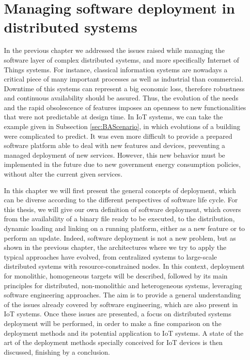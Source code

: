 \chapter{Managing software deployment in distributed systems}
\label{ch:managingDS}
In the previous chapter we addressed the issues raised while managing the software layer of complex distributed systems, and more specifically Internet of Things systems.
For instance, classical information systems are nowadays a critical piece of many important processes as well as industrial than commercial.
Downtime of this systems can represent a big economic loss, therefore robustness and continuous availability should be assured.
Thus, the evolution of the needs and the rapid obsolescence of features imposes an openness to new functionalities that were not predictable at design time.
In IoT systems, we can take the example given in Subsection \ref{sec:BAScenario}, in which evolutions of a building were complicated to predict.
It was even more difficult to provide a prepared software platform able to deal with new features and devices, preventing a managed deployment of new services.
However, this new behavior must be implemented in the future due to new government energy consumption policies, without alter the current given services.

In this chapter we will first present the general concepts of deployment, which can be diverse according to the different perspectives of software life cycle.
For this thesis, we will give our own definition of software deployment, which covers from the availability of a binary file ready to be executed, to the distribution, dynamic loading and linking on a running platform, either as a new feature or to perform an update.
Indeed, software deployment is not a new problem, but as shown in the previous chapter, the architectures where we try to apply the typical approaches have evolved, from centralized systems to large-scale distributed systems with resource-constrained nodes.
In this context, deployment for monolithic, homogeneous targets will be described, followed by its main principles for distributed, non-monolithic and heterogeneous systems, leveraging software engineering approaches.
The aim is to provide a general understanding of the issues already covered by software engineering, which are also present in IoT systems.
Once these issues are presented, a focus on distributed systems deployment will be performed, in order to make a fine comparison on the deployment methods and its potential application to IoT systems.
A state of the art of the deployment methods specially conceived for IoT devices is then discussed, finishing by a conclusion.

